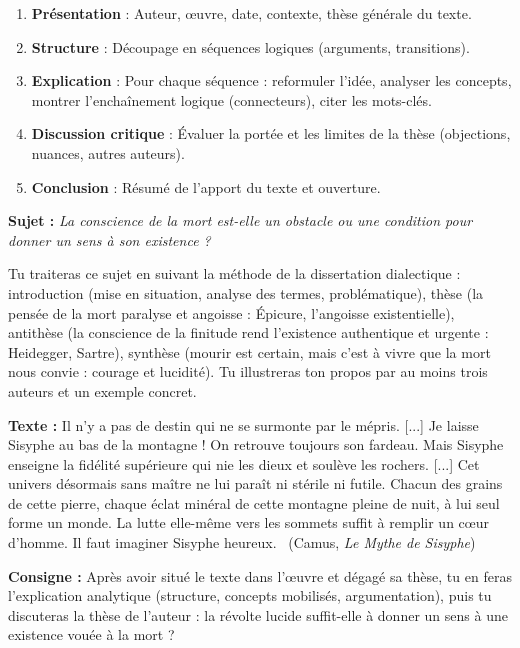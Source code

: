 \documentclass[11pt]{article}
\begin{document}
\begin{methode}
\begin{enumerate}
\item \textbf{Présentation} : Auteur, œuvre, date, contexte, thèse générale du texte.
\item \textbf{Structure} : Découpage en séquences logiques (arguments, transitions).
\item \textbf{Explication} : Pour chaque séquence : reformuler l'idée, analyser les concepts, montrer l'enchaînement logique (connecteurs), citer les mots-clés.
\item \textbf{Discussion critique} : Évaluer la portée et les limites de la thèse (objections, nuances, autres auteurs).
\item \textbf{Conclusion} : Résumé de l'apport du texte et ouverture.
\end{enumerate}
\end{methode}

\begin{exercice}
\textbf{Sujet :} \emph{La conscience de la mort est-elle un obstacle ou une condition pour donner un sens à son existence ?}

Tu traiteras ce sujet en suivant la méthode de la dissertation dialectique : introduction (mise en situation, analyse des termes, problématique), thèse (la pensée de la mort paralyse et angoisse : Épicure, l'angoisse existentielle), antithèse (la conscience de la finitude rend l'existence authentique et urgente : Heidegger, Sartre), synthèse (mourir est certain, mais c'est à vivre que la mort nous convie : courage et lucidité). Tu illustreras ton propos par au moins trois auteurs et un exemple concret.
\end{exercice}

\begin{exercice}
\textbf{Texte :} \guillemotleft Il n'y a pas de destin qui ne se surmonte par le mépris. [...] Je laisse Sisyphe au bas de la montagne ! On retrouve toujours son fardeau. Mais Sisyphe enseigne la fidélité supérieure qui nie les dieux et soulève les rochers. [...] Cet univers désormais sans maître ne lui paraît ni stérile ni futile. Chacun des grains de cette pierre, chaque éclat minéral de cette montagne pleine de nuit, à lui seul forme un monde. La lutte elle-même vers les sommets suffit à remplir un cœur d'homme. Il faut imaginer Sisyphe heureux. \guillemotright\ (Camus, \emph{Le Mythe de Sisyphe})

\textbf{Consigne :} Après avoir situé le texte dans l'œuvre et dégagé sa thèse, tu en feras l'explication analytique (structure, concepts mobilisés, argumentation), puis tu discuteras la thèse de l'auteur : la révolte lucide suffit-elle à donner un sens à une existence vouée à la mort ?
\end{exercice}
\end{document}
